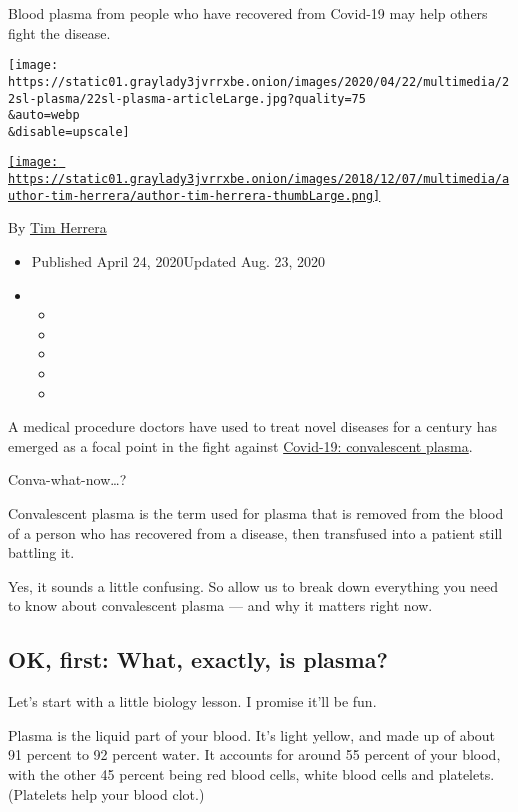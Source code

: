 Blood plasma from people who have recovered from Covid-19 may help
others fight the disease.

\texttt{[image: https://static01.graylady3jvrrxbe.onion/images/2020/04/22/multimedia/22sl-plasma/22sl-plasma-articleLarge.jpg?quality=75\\\&auto=webp\\\&disable=upscale]}

\href{https://www.nytimes3xbfgragh.onion/by/tim-herrera}{\texttt{[image: https://static01.graylady3jvrrxbe.onion/images/2018/12/07/multimedia/author-tim-herrera/author-tim-herrera-thumbLarge.png]}}

By \href{https://www.nytimes3xbfgragh.onion/by/tim-herrera}{Tim Herrera}

\begin{itemize}
\item
  Published April 24, 2020Updated Aug. 23, 2020
\item
  \begin{itemize}
  \item
  \item
  \item
  \item
  \item
  \end{itemize}
\end{itemize}

A medical procedure doctors have used to treat novel diseases for a
century has emerged as a focal point in the fight against
\href{https://www.nytimes3xbfgragh.onion/2020/08/23/us/politics/fda-plasma-coronavirus.html}{Covid-19:
convalescent plasma}.

Conva-what-now\ldots{}?

Convalescent plasma is the term used for plasma that is removed from the
blood of a person who has recovered from a disease, then transfused into
a patient still battling it.

Yes, it sounds a little confusing. So allow us to break down everything
you need to know about convalescent plasma --- and why it matters right
now.

\hypertarget{ok-first-what-exactly-is-plasma}{%
\subsection{OK, first: What, exactly, is
plasma?}\label{ok-first-what-exactly-is-plasma}}

Let's start with a little biology lesson. I promise it'll be fun.

Plasma is the liquid part of your blood. It's light yellow, and made up
of about 91 percent to 92 percent water. It accounts for around 55
percent of your blood, with the other 45 percent being red blood cells,
white blood cells and platelets. (Platelets help your blood clot.)

